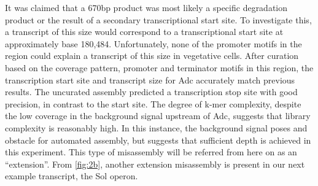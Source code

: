  It was claimed that a 670bp product was most likely a specific degradation product or the result of a secondary transcriptional start site\cite{65}. To investigate this, a transcript of this size would correspond to a transcriptional start site at approximately base 180,484. Unfortunately, none of the promoter motifs in the region could explain a transcript of this size in vegetative cells. After curation based on the coverage pattern, promoter and terminator motifs in this region, the transcription start site and transcript size for Adc accurately match previous results. The uncurated assembly predicted a transcription stop site with good precision, in contrast to the start site. The degree of k-mer complexity, despite the low coverage in the background signal upstream of Adc, suggests that library complexity is reasonably high. In this instance, the background signal poses and obstacle for automated assembly, but suggests that sufficient depth is achieved in this experiment. This type of misassembly will be referred from here on as an ``extension''. From \ref{fig:2b}, another extension misassembly is present in our next example transcript, the Sol operon.

